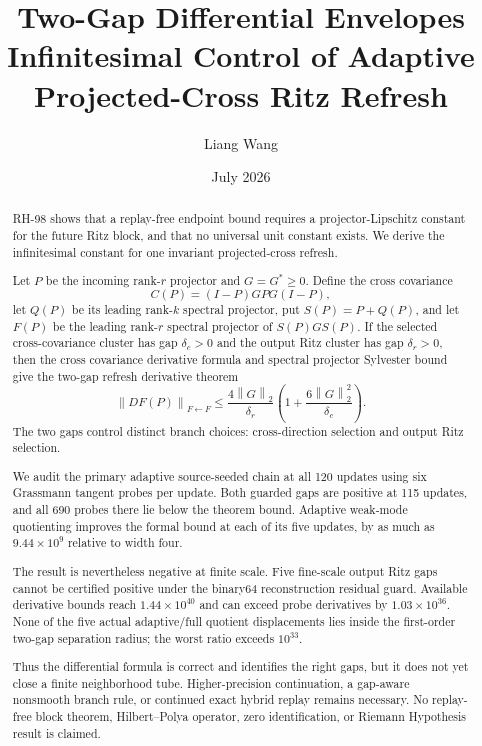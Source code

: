 \documentclass[11pt]{article}
\title{Two-Gap Differential Envelopes\\
\large Infinitesimal Control of Adaptive Projected-Cross Ritz Refresh}
\author{Liang Wang}
\date{July 2026}
\theoremstyle{definition}
\theoremstyle{remark}
\newcommand{\norm}[1]{\left\lVert#1\right\rVert}
\begin{document}
\maketitle

\begin{abstract}
RH-98 shows that a replay-free endpoint bound requires a
projector-Lipschitz constant for the future Ritz block, and that no universal
unit constant exists.  We derive the infinitesimal constant for one invariant
projected-cross refresh.

Let $P$ be the incoming rank-$r$ projector and $G=G^*\ge0$.  Define the cross
covariance
\[
 C(P)=(I-P)GPG(I-P),
\]
let $Q(P)$ be its leading rank-$k$ spectral projector, put
$S(P)=P+Q(P)$, and let $F(P)$ be the leading rank-$r$ spectral projector of
$S(P)GS(P)$.  If the selected cross-covariance cluster has gap
$\delta_c>0$ and the output Ritz cluster has gap $\delta_r>0$, then the
cross covariance derivative formula and spectral projector Sylvester bound
give the two-gap refresh derivative theorem
\[
 \norm{DF(P)}_{F\leftarrow F}
 \le
 \frac{4\norm G_2}{\delta_r}
 \left(1+\frac{6\norm G_2^2}{\delta_c}\right).
\]
The two gaps control distinct branch choices: cross-direction selection and
output Ritz selection.

We audit the primary adaptive source-seeded chain at all 120 updates using six
Grassmann tangent probes per update.  Both guarded gaps are positive at 115
updates, and all 690 probes there lie below the theorem bound.  Adaptive
weak-mode quotienting improves the formal bound at each of its five updates,
by as much as $9.44\times10^9$ relative to width four.

The result is nevertheless negative at finite scale.  Five fine-scale output
Ritz gaps cannot be certified positive under the binary64 reconstruction
residual guard.  Available derivative bounds reach $1.44\times10^{40}$ and can
exceed probe derivatives by $1.03\times10^{36}$.  None of the five actual
adaptive/full quotient displacements lies inside the first-order two-gap
separation radius; the worst ratio exceeds $10^{33}$.

Thus the differential formula is correct and identifies the right gaps, but
it does not yet close a finite neighborhood tube.  Higher-precision
continuation, a gap-aware nonsmooth branch rule, or continued exact hybrid
replay remains necessary.  No replay-free block theorem, Hilbert--Polya
operator, zero identification, or Riemann Hypothesis result is claimed.
\end{abstract}
\end{document}
